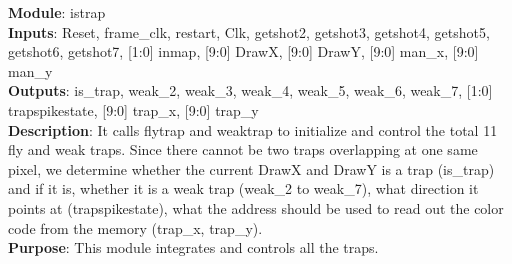 \documentclass[12pt]{article}
\begin{document}
\textbf{Module}: istrap \\ 
\textbf{Inputs}: Reset, frame\_clk, restart, Clk, getshot2, getshot3, getshot4, getshot5, getshot6, getshot7, [1:0] inmap, [9:0] DrawX, [9:0] DrawY, [9:0] man\_x, [9:0] man\_y \\ 
\textbf{Outputs}: is\_trap, weak\_2, weak\_3, weak\_4, weak\_5, weak\_6, weak\_7, [1:0] trapspikestate, [9:0] trap\_x, [9:0] trap\_y \\
\textbf{Description}: It calls flytrap and weaktrap to initialize and control the total 11 fly and weak traps. Since there cannot be two traps overlapping at one same pixel, we determine whether the current DrawX and DrawY is a trap (is\_trap) and if it is, whether it is a weak trap (weak\_2 to weak\_7), what direction it points at (trapspikestate), what the address should be used to read out the color code from the memory (trap\_x, trap\_y). \\ 
\textbf{Purpose}: This module integrates and controls all the traps. \\
\end{document}
